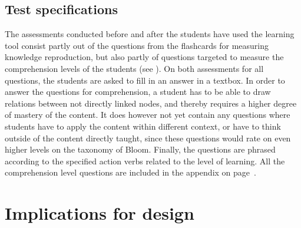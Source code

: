 
\subsection{Test specifications}

The assessments conducted before and after the students have used the learning tool consist partly out of the questions from the flashcards for measuring knowledge reproduction, but also partly of questions targeted to measure the comprehension levels of the students (see ). On both assessments for all questions, the students are asked to fill in an answer in a textbox. In order to answer the questions for comprehension, a student has to be able to draw relations between not directly linked nodes, and thereby requires a higher degree of mastery of the content. It does however not yet contain any questions where students have to apply the content within different context, or have to think outside of the content directly taught, since these questions would rate on even higher levels on the taxonomy of Bloom. Finally, the questions are phrased according to the specified action verbs related to the level of learning. All the comprehension level questions are included in the appendix on page~\pageref{ch:test}.

\section{Implications for design}
